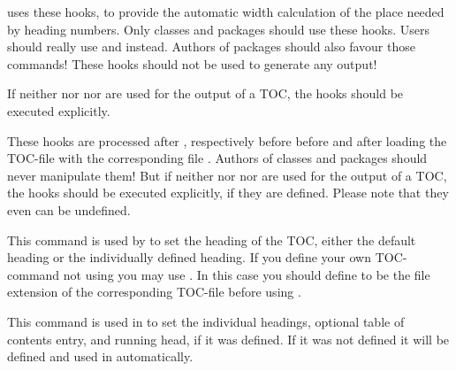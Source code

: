 \KOMAScript{} uses these hooks, to provide the automatic width calculation of
the place needed by heading numbers. Only classes and packages should use
these hooks. Users should really use
 and  instead. Authors of
packages should also favour those commands! These hooks should not be used to
generate any output!

If neither  nor 
nor  are used for the output of a TOC, the hooks should be
executed explicitly.%
\EndIndexGroup


\begin{Declaration}
\end{Declaration}
These hooks are processed after , respectively
before  before and after loading the TOC-file with
the corresponding file . Authors  of
classes and packages should never manipulate them! But if
neither  nor  nor
 are used for the output of a TOC, the hooks should be
executed explicitly, if they are defined. Please note that they even can be
undefined.%
\EndIndexGroup


\begin{Declaration}
\end{Declaration}
This command is used by  to set the heading of the TOC,
either the default heading or the individually defined heading. If you define
your own TOC-command not using  you may use
. In this case you should define
 to be the file
extension of the corresponding TOC-file before using
.%
\EndIndexGroup


\begin{Declaration}
\end{Declaration}
This command is used in  to set the individual
headings, optional table of contents entry, and running head, if it was
defined. If it was not defined it will be defined and used in
 automatically.
\EndIndexGroup


